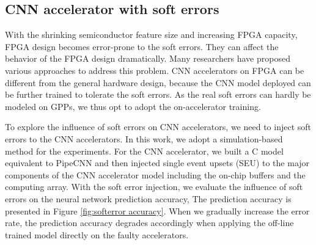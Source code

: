 %

\subsection{CNN accelerator with soft errors}
With the shrinking semiconductor feature size and increasing FPGA capacity, 
FPGA design becomes error-prone to the soft errors. 
They can affect the behavior of the FPGA design dramatically. 
Many researchers \cite{Mansour_20,Karim_21,Nidhin_22,Subasi_23,ROSCH_24} 
have proposed various approaches to address this problem. CNN accelerators 
on FPGA can be different from the general hardware design, because 
the CNN model deployed can be further trained to tolerate the 
soft errors. As the real soft errors can hardly be modeled on GPPs, we thus
opt to adopt the on-accelerator training.

To explore the influence of soft errors on CNN accelerators, 
we need to inject soft errors to the CNN accelerators. 
In this work, we adopt a simulation-based method for the experiments. 
For the CNN accelerator, we built a C model equivalent to PipeCNN and then injected single event 
upsets (SEU) to the major components of the CNN accelerator model including the on-chip buffers 
and the computing array. With the soft error injection, we evaluate the influence of 
soft errors on the neural network prediction accuracy, The prediction accuracy 
is presented in Figure \ref{fig:softerror accuracy}. When we gradually increase the error rate, 
the prediction accuracy degrades accordingly when applying the off-line 
trained model directly on the faulty accelerators. 

